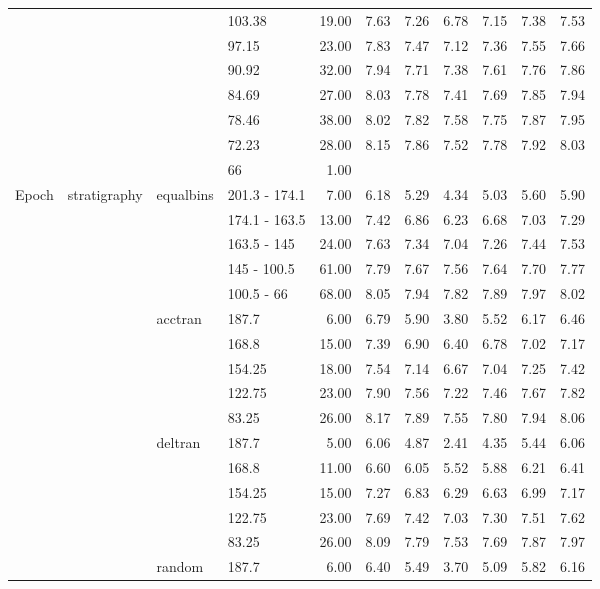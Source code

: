 \begin{longtable}{llllrrrrrrr}
   &  &  & 103.38 & 19.00 & 7.63 & 7.26 & 6.78 & 7.15 & 7.38 & 7.53 \\ 
   &  &  & 97.15 & 23.00 & 7.83 & 7.47 & 7.12 & 7.36 & 7.55 & 7.66 \\ 
   &  &  & 90.92 & 32.00 & 7.94 & 7.71 & 7.38 & 7.61 & 7.76 & 7.86 \\ 
   &  &  & 84.69 & 27.00 & 8.03 & 7.78 & 7.41 & 7.69 & 7.85 & 7.94 \\ 
   &  &  & 78.46 & 38.00 & 8.02 & 7.82 & 7.58 & 7.75 & 7.87 & 7.95 \\ 
   &  &  & 72.23 & 28.00 & 8.15 & 7.86 & 7.52 & 7.78 & 7.92 & 8.03 \\ 
   &  &  & 66 & 1.00 &  &  &  &  &  &  \\ 
  Epoch & stratigraphy & equalbins & 201.3 - 174.1 & 7.00 & 6.18 & 5.29 & 4.34 & 5.03 & 5.60 & 5.90 \\ 
   &  &  & 174.1 - 163.5 & 13.00 & 7.42 & 6.86 & 6.23 & 6.68 & 7.03 & 7.29 \\ 
   &  &  & 163.5 - 145 & 24.00 & 7.63 & 7.34 & 7.04 & 7.26 & 7.44 & 7.53 \\ 
   &  &  & 145 - 100.5 & 61.00 & 7.79 & 7.67 & 7.56 & 7.64 & 7.70 & 7.77 \\ 
   &  &  & 100.5 - 66 & 68.00 & 8.05 & 7.94 & 7.82 & 7.89 & 7.97 & 8.02 \\ 
   &  & acctran & 187.7 & 6.00 & 6.79 & 5.90 & 3.80 & 5.52 & 6.17 & 6.46 \\ 
   &  &  & 168.8 & 15.00 & 7.39 & 6.90 & 6.40 & 6.78 & 7.02 & 7.17 \\ 
   &  &  & 154.25 & 18.00 & 7.54 & 7.14 & 6.67 & 7.04 & 7.25 & 7.42 \\ 
   &  &  & 122.75 & 23.00 & 7.90 & 7.56 & 7.22 & 7.46 & 7.67 & 7.82 \\ 
   &  &  & 83.25 & 26.00 & 8.17 & 7.89 & 7.55 & 7.80 & 7.94 & 8.06 \\ 
   &  & deltran & 187.7 & 5.00 & 6.06 & 4.87 & 2.41 & 4.35 & 5.44 & 6.06 \\ 
   &  &  & 168.8 & 11.00 & 6.60 & 6.05 & 5.52 & 5.88 & 6.21 & 6.41 \\ 
   &  &  & 154.25 & 15.00 & 7.27 & 6.83 & 6.29 & 6.63 & 6.99 & 7.17 \\ 
   &  &  & 122.75 & 23.00 & 7.69 & 7.42 & 7.03 & 7.30 & 7.51 & 7.62 \\ 
   &  &  & 83.25 & 26.00 & 8.09 & 7.79 & 7.53 & 7.69 & 7.87 & 7.97 \\ 
   &  & random & 187.7 & 6.00 & 6.40 & 5.49 & 3.70 & 5.09 & 5.82 & 6.16 \\ 

\end{longtable}
